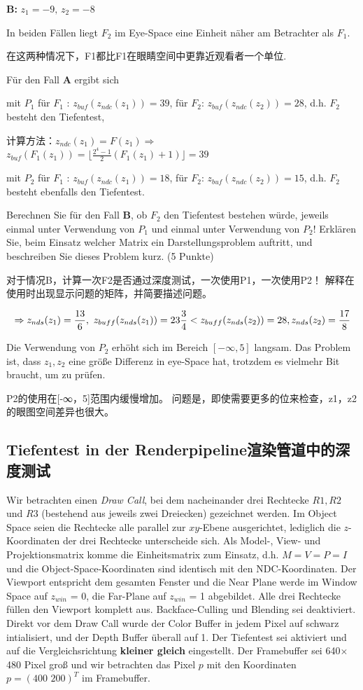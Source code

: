 \documentclass[fleqn]{article}
\begin{document}
\textbf{B:} $z_1=-9,\,z_2=-8$

In beiden Fällen liegt $F_2$ im Eye-Space eine Einheit näher am Betrachter als $F_1$.

在这两种情况下，F1都比F1在眼睛空间中更靠近观看者一个单位.

Für den Fall \textbf{A} ergibt sich

mit $P_1$ für $F_1$ : $z_{buf}(z_{ndc}(z_1))=39$, für $F_2$: $z_{buf}(z_{ndc}(z_2))=28$, d.h. $F_2$ besteht den Tiefentest,

计算方法：$z_{ndc}(z_1)=F(z_1)\Rightarrow$ $z_{buf}(F_1(z_1))=\lfloor\frac{2^4-1}{2}(F_1(z_1)+1)\rfloor=39$

mit $P_2$ für $F_1$ : $z_{buf}(z_{ndc}(z_1))=18$, für $F_2$: $z_{buf}(z_{ndc}(z_2))=15$, d.h. $F_2$ besteht ebenfalls den Tiefentest.

Berechnen Sie für den Fall \textbf{B}, ob $F_2$ den Tiefentest bestehen würde,
 jeweils einmal unter Verwendung von $P_1$ und einmal unter Verwendung von $P_2$! 
 Erklären Sie, beim Einsatz welcher Matrix ein Darstellungsproblem auftritt, und beschreiben Sie dieses Problem kurz. (5 Punkte)

 对于情况B，计算一次F2是否通过深度测试，一次使用P1，一次使用P2！ 解释在使用时出现显示问题的矩阵，并简要描述问题。

 
 $$\Rightarrow z_{nds}(z_1) = \frac{13}{6}, \ z_{buff}(z_{nds}(z_1)) = 23\frac{3}{4} < z_{buff}(z_{nds}(z_2))=28, \\ z_{nds}(z_2) = \frac{17}{8}$$
 
 Die Verwendung von $P_2$ erhöht sich im Bereich $[-\infty,5]$ langsam. Das Problem ist, dass $z_1,z_2$ eine größe Differenz in eye-Space hat, trotzdem es vielmehr Bit braucht, um zu prüfen.
 
 P2的使用在[-∞，5]范围内缓慢增加。 问题是，即使需要更多的位来检查，z1，z2的眼图空间差异也很大。
 
\subsection{Tiefentest in der Renderpipeline渲染管道中的深度测试}

Wir betrachten einen \textit{Draw Call}, bei dem nacheinander drei Rechtecke $R1,R2$ und $R3$
 (bestehend aus jeweils zwei Dreiecken) gezeichnet werden. 
 Im Object Space seien die Rechtecke alle parallel zur $xy$-Ebene ausgerichtet, 
 lediglich die $z$-Koordinaten der drei Rechtecke unterscheide sich. Als Model-, View- 
 und Projektionsmatrix komme die Einheitsmatrix zum Einsatz, d.h. $M = V = P = I$ 
 und die Object-Space-Koordinaten sind identisch mit den NDC-Koordinaten. 
 Der Viewport entspricht dem gesamten Fenster und die Near Plane werde im Window Space auf 
 $z_{win}$ = 0, die Far-Plane auf $z_{win}$ = 1 abgebildet. 
 Alle drei Rechtecke füllen den Viewport komplett aus. Backface-Culling und Blending sei 
 deaktiviert. Direkt vor dem Draw Call wurde der Color Buffer in jedem Pixel auf 
 schwarz intialisiert, und der Depth Buffer überall auf 1. Der Tiefentest sei aktiviert 
 und auf die Vergleichsrichtung \textbf{kleiner gleich} eingestellt. 
 Der Framebuffer sei 640$\times$480 Pixel groß und wir betrachten das Pixel $p$ mit den Koordinaten 
$p=(400\,\,200)^T$ im Framebuffer.
\end{document}
